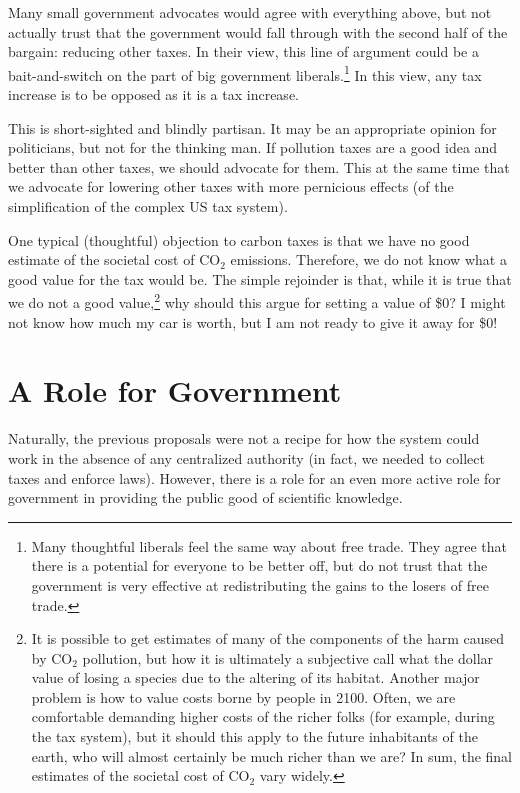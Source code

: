 Many small government advocates would agree with everything above, but not
actually trust that the government would fall through with the second half of
the bargain: reducing other taxes. In their view, this line of argument could
be a bait-and-switch on the part of big government liberals.\footnote{Many
thoughtful liberals feel the same way about free trade. They agree that there
is a potential for everyone to be better off, but do not trust that the
government is very effective at redistributing the gains to the losers of free
trade.} In this view, any tax increase is to be opposed as it is a tax
increase.

This is short-sighted and blindly partisan. It may be an appropriate opinion
for politicians, but not for the thinking man. If pollution taxes are a good
idea and better than other taxes, we should advocate for them. This at the same
time that we advocate for lowering other taxes with more pernicious effects (of
the simplification of the complex US tax system).

One typical (thoughtful) objection to carbon taxes is that we have no good
estimate of the societal cost of CO${}_2$ emissions. Therefore, we do not know
what a good value for the tax would be. The simple rejoinder is that, while it
is true that we do not a good value,\footnote{It is possible to get estimates
of many of the components of the harm caused by CO${}_2$ pollution, but how it
is ultimately a subjective call what the dollar value of losing a species due
to the altering of its habitat. Another major problem is how to value costs
borne by people in 2100. Often, we are comfortable demanding higher costs of
the richer folks (for example, during the tax system), but it should this apply
to the future inhabitants of the earth, who will almost certainly be much
richer than we are? In sum, the final estimates of the societal cost of
CO${}_2$ vary widely.} why should this argue for setting a value of \$0? I
might not know how much my car is worth, but I am not ready to give it away for
\$0!

\section{A Role for Government}

Naturally, the previous proposals were not a recipe for how the system could
work in the absence of any centralized authority (in fact, we needed to collect
taxes and enforce laws). However, there is a role for an even more active role
for government in providing the public good of scientific knowledge.

